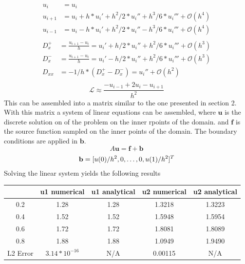 \documentclass{article}
\begin{document}
\begin{align}
    u_i &= u_i\\
    u_{i+1} &= u_i + h * u_i' + h^2/2 * u_i'' + h^3/6 * u_i''' + \mathcal{O}\left(h^4\right)\\
    u_{i-1} &= u_i - h * u_i' + h^2/2 * u_i'' - h^3/6 * u_i''' + \mathcal{O}\left(h^4\right)\\
\end{align}
\begin{align}
    D_x^+ &= \frac{u_{i+1}-u_i}{h} = u_i' + h/2 * u_i'' + h^2/6 * u_i''' + \mathcal{O}\left(h^3\right)\\
    D_x^- &= \frac{u_{i+1}-u_i}{h} = u_i' - h/2 * u_i'' + h^2/6 * u_i''' + \mathcal{O}\left(h^3\right)\\
    D_{xx} &= -1/h*\left(D_x^+ - D_x^-\right) = u_i'' + \mathcal{O}\left(h^2\right)\\
\end{align}
\begin{equation}
    \mathcal{L} \approx \frac{-u_{i-1}+2u_i-u_{i+1}}{h^2}
\end{equation}
This can be assembled into a matrix similar to the one presented in section 2. With this matrix a system of linear equations can be assembled, where $\mathbf{u}$ is the discrete solution on of the problem on the inner rpoints of the domain. and $\mathbf{f}$ is the source function sampled on the inner points of the domain. The boundary conditions are applied in $\mathbf{b}$.
\begin{equation}
    A\mathbf{u} = \mathbf{f}+\mathbf{b}
\end{equation}
\begin{equation}
    \mathbf{b} = [u(0)/h^2, 0, \dots, 0, u(1)/h^2]^T\\
\end{equation}
Solving the linear system yields the following results
\begin{table}[H]
    \centering
    \begin{tabular}{c|c|c|c|c}
        & u1 numerical & u1 analytical & u2 numerical & u2 analytical \\ \hline
        0.2 & 1.28 & 1.28 & 1.3218 & 1.3223 \\ \hline
        0.4 & 1.52 & 1.52 & 1.5948 & 1.5954 \\ \hline
        0.6 & 1.72 & 1.72 & 1.8081 & 1.8089 \\ \hline
        0.8 & 1.88 & 1.88 & 1.0949 & 1.9490 \\ \hline
        L2 Error& $3.14 * 10^{-16}$ & N/A &0.00115 & N/A
        
    \end{tabular}
\end{table}
\end{document}
